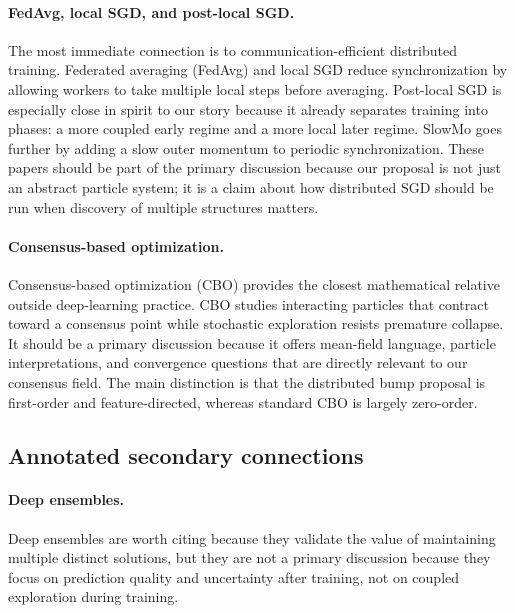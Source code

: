 \documentclass{article}
\begin{document}
\paragraph{FedAvg, local SGD, and post-local SGD.}
The most immediate connection is to communication-efficient distributed
training. Federated averaging (FedAvg) \cite{mcmahan2017communication}
and local SGD \cite{stich2019local} reduce synchronization by allowing
workers to take multiple local steps before averaging. Post-local SGD
\cite{lin2020dont} is especially close in spirit to our story because it
already separates training into phases: a more coupled early regime and
a more local later regime. SlowMo \cite{wang2020slowmo} goes further by
adding a slow outer momentum to periodic synchronization. These papers
should be part of the primary discussion because our proposal is not
just an abstract particle system; it is a claim about how distributed
SGD should be run when discovery of multiple structures matters.

\paragraph{Consensus-based optimization.}
Consensus-based optimization (CBO) \cite{pinnau2017consensus} provides
the closest mathematical relative outside deep-learning practice. CBO
studies interacting particles that contract toward a consensus point
while stochastic exploration resists premature collapse. It should be a
primary discussion because it offers mean-field language, particle
interpretations, and convergence questions that are directly relevant to
our consensus field. The main distinction is that the distributed bump
proposal is first-order and feature-directed, whereas standard CBO is
largely zero-order.

\subsection*{Annotated secondary connections}

\paragraph{Deep ensembles.}
Deep ensembles \cite{lakshminarayanan2017simple} are worth citing
because they validate the value of maintaining multiple distinct
solutions, but they are not a primary discussion because they focus on
prediction quality and uncertainty after training, not on coupled
exploration during training.
\end{document}
